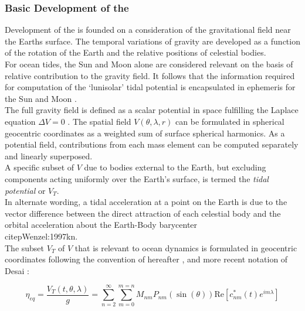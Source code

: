 \subsubsection{Basic Development of the \ATGP{}}  \label{S:basic_potential}

Development of the \ATGP{} is founded on a consideration of the gravitational field near the Earths surface. The temporal variations of gravity are developed as a function of the rotation of the Earth and the relative positions of celestial bodies.\\
For ocean tides, the Sun and Moon alone are considered relevant on the basis of relative contribution to the gravity field. It follows that the information required for computation of the `lunisolar' tidal potential is encapsulated in ephemeris for the Sun and Moon \citep{Agnew:2011ub}.\\



The full gravity field is defined as a scalar potential in space fulfilling the Laplace equation $\Delta V=0$ \citep[sec 5.3.1]{Urban:2013vl}.  The spatial field $V(\theta,\lambda,r)$ can be formulated in spherical geocentric coordinates as a weighted sum of surface spherical harmonics. As a potential field, contributions from each mass element can be computed separately and linearly superposed.\\
A specific subset of $V$ due to bodies external to the Earth, but excluding components acting uniformly over the Earth's surface, is termed the \emph{tidal potential} \ATGP{} or $V_T$.\\
In alternate wording, a tidal acceleration at a point on the Earth is due to the vector difference between the direct attraction of each celestial body and the orbital acceleration about the Earth-Body barycenter\\citep{Wenzel:1997kn}.\\

The subset $V_T$ of $V$ that is relevant to ocean dynamics is formulated in geocentric coordinates following the convention of \cite{Cartwright:1973em} hereafter \CTE{}, and more recent notation of Desai \cite{Desai:2006wo}:

\begin{equation}
\label{E:VT}
\eta_{eq} = \frac{V_T(t,\theta,\lambda) }{g} = \sum_{n=2}^{\infty} \sum_{m=0}^{m=n} M_{nm} P_{nm}( \sin(\theta) ) \text{Re} \left [ c^{*}_{nm}(t) e^{im\lambda} \right ]
\end{equation}

